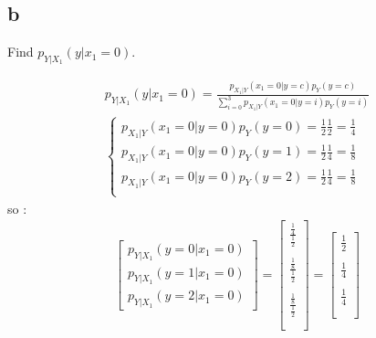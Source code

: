 \documentclass[12pt]{article}
\begin{document}
\subsection{b}
Find $p_{Y|X_1}(y|x_1 = 0)$.
\begin{qsolve}
    \begin{gather*}
        p_{Y|X_1}(y|x_1 = 0) = \frac{p_{X_1|Y}(x_1=0|y=c)p_{Y}(y=c)}{\sum_{i=0}^{3}p_{X_1|Y}(x_1=0|y=i)p_{Y}(y=i)}\\
        \begin{cases}
            p_{X_1|Y}(x_1=0|y=0)p_{Y}(y=0) = \frac{1}{2} \frac{1}{2} = \frac{1}{4} \\
            p_{X_1|Y}(x_1=0|y=0)p_{Y}(y=1) = \frac{1}{2} \frac{1}{4} = \frac{1}{8} \\
            p_{X_1|Y}(x_1=0|y=0)p_{Y}(y=2) = \frac{1}{2} \frac{1}{4} = \frac{1}{8} \\
        \end{cases}
    \end{gather*}
    so :
    \begin{gather*}
        \begin{bmatrix}
            p_{Y|X_1}(y = 0 |x_1 = 0) \\
            p_{Y|X_1}(y = 1 |x_1 = 0) \\
            p_{Y|X_1}(y = 2 |x_1 = 0)
        \end{bmatrix}
        = \begin{bmatrix}
            \frac{\frac{1}{4}}{\frac{1}{2}} \\ \\
            \frac{\frac{1}{8}}{\frac{1}{2}} \\ \\
            \frac{\frac{1}{8}}{\frac{1}{2}} \\ \\
        \end{bmatrix}
        = \begin{bmatrix}
            \frac{1}{2} \\ \\
            \frac{1}{4} \\ \\
            \frac{1}{4} \\ \\
        \end{bmatrix}
    \end{gather*}
\end{qsolve}
\end{document}
